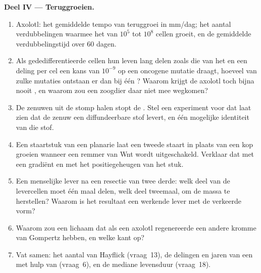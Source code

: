 \begin{problem}
\medskip
\noindent\textbf{Deel IV --- Teruggroeien.}
\begin{enumerate}[resume]
  \item Axolotl: het gemiddelde tempo van teruggroei in mm/dag; het
        aantal verdubbelingen waarmee het  van $10^{5}$ tot
        $10^{8}$ cellen groeit, en de gemiddelde verdubbelingstijd over
        60 dagen.
  \item Als gededifferentieerde cellen hun leven lang delen zoals die
        van het  en een deling per cel een kans van $10^{-9}$
        op een oncogene mutatie draagt, hoeveel van zulke mutaties
        ontstaan er dan bij één ? Waarom krijgt de axolotl
        toch bijna nooit , en waarom zou een zoogdier daar niet
        mee wegkomen?
  \item De zenuwen uit de stomp halen stopt de . Stel een
        experiment voor dat laat zien dat de zenuw een diffundeerbare
        stof levert, en één mogelijke identiteit van die stof.
  \item Een staartstuk van een planarie laat een tweede staart in
        plaats van een kop groeien wanneer een remmer van Wnt wordt
        uitgeschakeld. Verklaar dat met een gradiënt en met het
        positiegeheugen van het stuk.
  \item Een menselijke lever na een resectie van twee derde: welk deel
        van de levercellen moet één maal delen, welk deel tweemaal, om
        de massa te herstellen? Waarom is het resultaat een werkende
        lever met de verkeerde vorm?
  \item Waarom zou een lichaam dat als een axolotl regenereerde een
        andere kromme van Gompertz hebben, en welke kant op?
  \item Vat samen: het aantal van Hayflick (vraag~13), de delingen en
        jaren van een  met hulp van  (vraag~6), en de
        mediane levensduur (vraag~18).
\end{enumerate}
\end{problem}
